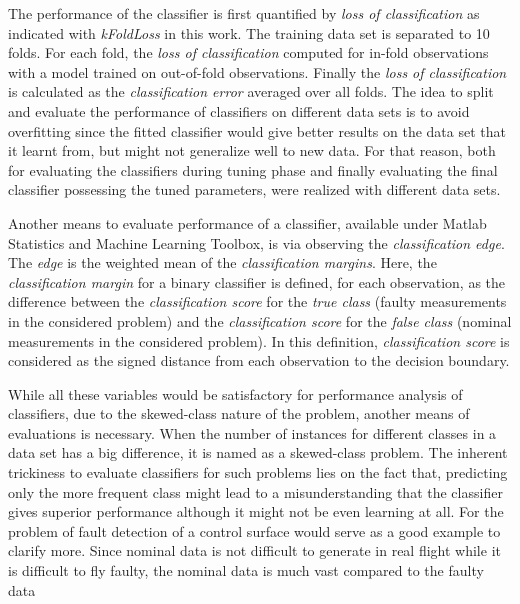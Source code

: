 The performance of the classifier is first quantified by \emph{loss of classification} as indicated with \emph{kFoldLoss} in this work. 
The training data set is  separated to 10 folds. For each fold, the \emph{loss of classification} computed for in-fold observations with a model trained on out-of-fold observations. 
Finally the \emph{loss of classification} is calculated as the \emph{classification error} averaged over all folds.
The idea to split and evaluate the performance of classifiers on different data sets is to avoid overfitting since the fitted classifier would give better results on the data set that it learnt from, but might not generalize well to new data. 
For that reason, both for evaluating the classifiers during tuning phase and finally evaluating the final classifier possessing the tuned parameters, were realized with different data sets.

Another means to evaluate performance of a classifier, available under Matlab Statistics and Machine Learning Toolbox, is via observing the \emph{classification edge}. 
The \emph{edge} is the weighted mean of the \emph{classification margins}. 
Here, the \emph{classification margin} for a binary classifier is defined, for each observation, as the difference between the \emph{classification score} for the \emph{true class} (faulty measurements in the considered problem) and the \emph{classification score} for the \emph{false class} (nominal measurements in the considered problem). 
In this definition, \emph{classification score} is considered as the signed distance from each observation to the decision boundary.

While all these variables would be satisfactory for performance analysis of classifiers, due to the skewed-class nature of the problem, another means of evaluations is necessary.
When the number of instances for different classes in a data set has a big difference, it is named as a skewed-class problem. 
The inherent trickiness to evaluate classifiers for such problems lies on the fact that, predicting only the more frequent class might lead to a misunderstanding that the classifier gives superior performance although it might not be even learning at all. 
For the problem of fault detection of a control surface would serve as a good example to clarify more. 
Since nominal data is not difficult to generate in real flight while it is difficult to fly faulty, the nominal data is much vast compared to the faulty data 

